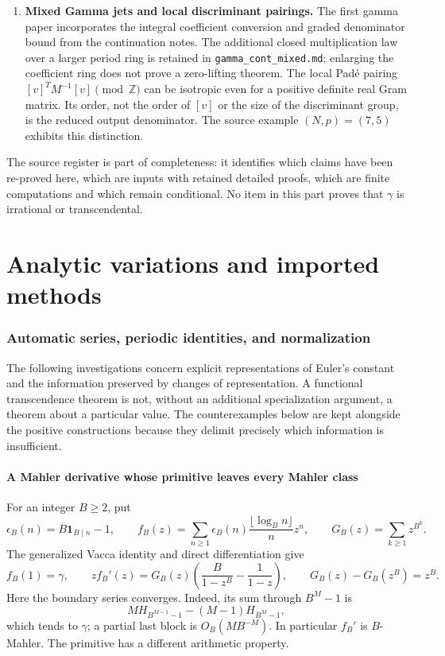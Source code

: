\documentclass[11pt,a4paper]{article}
\newcommand{\Z}{\mathbb Z}
\theoremstyle{definition}
\theoremstyle{remark}
\numberwithin{equation}{section}
\begin{document}
\begin{enumerate}
\item \textbf{Mixed Gamma jets and local discriminant pairings.}
The first gamma paper incorporates the integral coefficient conversion
and graded denominator bound from the continuation notes.  The additional
closed multiplication law over a larger period ring is retained in
\texttt{gamma\_cont\_mixed.md}; enlarging the coefficient ring does
not prove a zero-lifting theorem.  The local Pad\'e pairing
$[v]^TM^{-1}[v]\pmod\Z$ can be isotropic even for a positive definite
real Gram matrix.  Its order, not the order of $[v]$ or the size of the
discriminant group, is the reduced output denominator.  The source
example $(N,p)=(7,5)$ exhibits this distinction.
\end{enumerate}

The source register is part of completeness: it identifies which claims
have been re-proved here, which are inputs with retained detailed proofs,
which are finite computations and which remain conditional.  No item in
this part proves that $\gamma$ is irrational or transcendental.


\clearpage
\part{Analytic variations and imported methods}\label{master:analytic}
\section{Automatic series, periodic identities, and normalization}
\label{ar:automatic}
The following investigations concern explicit representations of Euler's
constant and the information preserved by changes of representation.  A
functional transcendence theorem is not, without an additional specialization
argument, a theorem about a particular value.  The counterexamples below are
kept alongside the positive constructions because they delimit precisely
which information is insufficient.

\subsection{A Mahler derivative whose primitive leaves every Mahler class}
For an integer $B\ge2$, put
\[
 \epsilon_B(n)=B\mathbf1_{B\mid n}-1,\qquad
 f_B(z)=\sum_{n\ge1}\epsilon_B(n)
       \frac{\lfloor\log_Bn\rfloor}{n}z^n,\qquad
 G_B(z)=\sum_{k\ge1}z^{B^k}.
\]
The generalized Vacca identity \cite{ar:SondowVacca} and direct differentiation
give
\begin{equation}\label{ar:vacca}
 f_B(1)=\gamma,\qquad
 zf_B'(z)=G_B(z)\left(\frac B{1-z^B}-\frac1{1-z}\right),\qquad
 G_B(z)-G_B(z^B)=z^B.
\end{equation}
Here the boundary series converges.  Indeed, its sum through $B^M-1$ is
\[
 M H_{B^{M-1}-1}-(M-1)H_{B^M-1},
\]
which tends to $\gamma$; a partial last block is $O_B(MB^{-M})$.
In particular $f_B'$ is $B$-Mahler.  The primitive has a different
arithmetic property.
\end{document}
